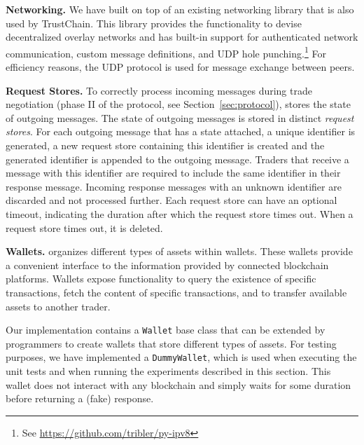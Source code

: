 \textbf{Networking.}
We have built \ModelName{} on top of an existing networking library that is also used by TrustChain.
This library provides the functionality to devise decentralized overlay networks and has built-in support for authenticated network communication, custom message definitions, and UDP hole punching.\footnote{See \url{https://github.com/tribler/py-ipv8}}
For efficiency reasons, the UDP protocol is used for message exchange between peers.

\textbf{Request Stores.}
To correctly process incoming messages during trade negotiation (phase II of the \ModelName{} protocol, see Section~\ref{sec:protocol}), \ModelName{} stores the state of outgoing messages.
The state of outgoing messages is stored in distinct \emph{request stores}.
For each outgoing message that has a state attached, a unique identifier is generated, a new request store containing this identifier is created and the generated identifier is appended to the outgoing message.
Traders that receive a message with this identifier are required to include the same identifier in their response message.
Incoming response messages with an unknown identifier are discarded and not processed further.
Each request store can have an optional timeout, indicating the duration after which the request store times out.
When a request store times out, it is deleted.

\textbf{Wallets.}
\ModelName{} organizes different types of assets within wallets.
These wallets provide a convenient interface to the information provided by connected blockchain platforms.
Wallets expose functionality to query the existence of specific transactions, fetch the content of specific transactions, and to transfer available assets to another trader.

Our implementation contains a \texttt{Wallet} base class that can be extended by programmers to create wallets that store different types of assets.
For testing purposes, we have implemented a \texttt{DummyWallet}, which is used when executing the unit tests and when running the experiments described in this section.
This wallet does not interact with any blockchain and simply waits for some duration before returning a (fake) response.

